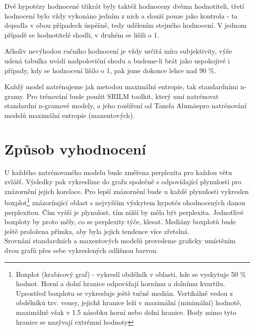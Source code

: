 \documentclass[12pt,a4paper]{report}
\begin{document}
Dvě hypotézy hodnocené třikrát byly taktéž hodnoceny dvěma hodnotiteli, třetí hodnocení bylo vždy vykonáno jedním z nich a slouží pouze jako kontrola - ta dopadla v obou případech úspěšně, tedy udělením stejného hodnocení. V jednom případě se hodnotitelé shodli, v druhém se lišili o 1.

Ačkoliv nevýhodou ručního hodnocení je vždy určitá míra subjektivity, výše udená tabulka uvádí nadpoloviční shodu a budeme-li brát jako uspokojivé i případy, kdy se hodnocení lišilo o 1, pak jsme dokonce lehce nad 90 \%.

Každý model natrénujeme jak metodou maximální entropie, tak standardními n-gramy. Pro trénování bude použit SRILM toolkit\footnotemark[2], který umí natrénovat standardní n-gramové modely, a jeho rozšíření od Tanela Alumäe\footnotemark[3] pro natrénování modelů maximální entropie (maxentových).

\section{Způsob vyhodnocení}
U každého natrénovaného modelu bude změřena perplexita pro každou větu zvlášť. Výsledky pak vykreslíme do grafu společně s odpovídající plynulostí pro znázornění jejich korelace. Pro lepší znázornění bude u každé plynulosti vykreslen boxplot\footnote{Boxplot (krabicový graf) - vykreslí obdélník v oblasti, kde se vyskytuje 50 \% hodnot. Horní a dolní hranice odpovídají hornímu a dolnímu kvartilu. Uprostřed boxplotu se vykresluje ještě tučně medián. Vertikálně vedou z obdélníků tzv. vousy, jejichž hranice leží v maximální (minimální) hodnotě, maximálně však v 1.5 násobku horní nebo dolní hranice. Body mimo tyto hranice se nazývají extrémní hodnoty} znázorňující oblast s nejvyšším výskytem hypotéz ohodnocených danou perplexitou. Čím vyšší je plynulost, tím nižší by měla být perplexita. Jednotlivé boxploty by proto měly, co se perplexity týče, klesat. Mediány boxplotů bude ještě proložena přímka, aby byla jejich tendence více zřetelná. \\
Srovnání standardních a maxentových modelů provedeme graficky umístěním dvou grafů přes sebe vykreslených odlišnou barvou.
\end{document}
